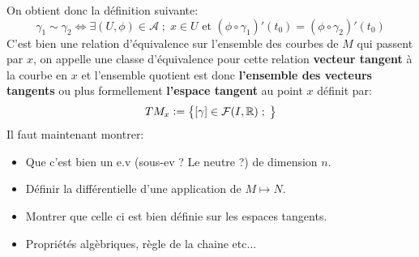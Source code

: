 On obtient donc la définition suivante:
\[ 
   \gamma_1 \sim \gamma_2 \iff \exists (U, \phi) \in \mathcal{A} \; ; \; x \in U \text{ et } (\phi \circ \gamma_1)'(t_0) = (\phi \circ \gamma_2)'(t_0)
\]
C'est bien une relation d'équivalence sur l'ensemble des courbes de \( M \) qui passent par \( x \), on appelle une classe d'équivalence pour cette relation \textbf{vecteur tangent} à la courbe en \( x \) et l'ensemble quotient est donc \textbf{l'ensemble des vecteurs tangents} ou plus formellement \textbf{l'espace tangent} au point \( x \) définit par:
\[ 
   TM_x := \left\{ [\gamma] \in \mathcal{F}(I, \mathbb{R}) \; ; \;   \right\}  
\]
\<
Il faut maintenant montrer:
\begin{itemize}
   \item Que c'est bien un e.v (sous-ev ? Le neutre ?) de dimension \( n \).
   \item Définir la différentielle d'une application de \( M \longmapsto N \).
   \item Montrer que celle ci est bien définie sur les espaces tangents.
   \item Propriétés algèbriques, règle de la chaine etc...
\end{itemize}